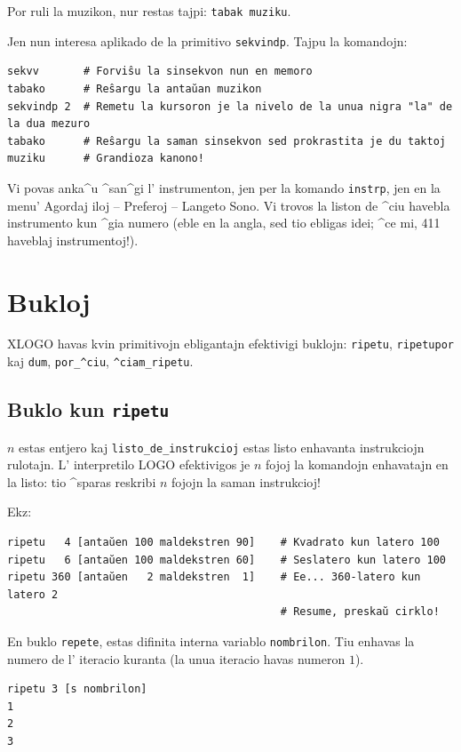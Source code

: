 Por ruli la muzikon, nur restas tajpi: \texttt{tabak muziku}.

Jen nun interesa aplikado de la primitivo \texttt{sekvindp}.  Tajpu la
komandojn:

\begin{verbatim}
sekvv       # Forviŝu la sinsekvon nun en memoro
tabako      # Reŝargu la antaŭan muzikon 
sekvindp 2  # Remetu la kursoron je la nivelo de la unua nigra "la" de la dua mezuro
tabako      # Reŝargu la saman sinsekvon sed prokrastita je du taktoj
muziku      # Grandioza kanono!
\end{verbatim}

Vi povas anka^u ^san^gi l' instrumenton, jen per la komando
\texttt{instrp}, jen en la menu' Agordaj iloj -- Preferoj -- Langeto
Sono.  Vi trovos la liston de ^ciu havebla instrumento kun ^gia numero
(eble en la angla, sed tio ebligas idei; ^ce mi, 411 haveblaj
instrumentoj!).

\section{Bukloj}

XLOGO havas kvin primitivojn ebligantajn efektivigi buklojn:
\texttt{ripetu}, \texttt{ripetupor} kaj \texttt{dum},
\texttt{por\_^ciu}, \texttt{^ciam\_ripetu}.

\subsection{Buklo kun \texttt{ripetu}}


$n$ estas entjero kaj \texttt{listo\_de\_instrukcioj} estas listo
enhavanta instrukciojn rulotajn.  L' interpretilo LOGO efektivigos je
$n$ fojoj la komandojn enhavatajn en la listo: tio ^sparas reskribi
$n$ fojojn la saman instrukcioj!  

Ekz:
\begin{verbatim}
ripetu   4 [antaŭen 100 maldekstren 90]    # Kvadrato kun latero 100
ripetu   6 [antaŭen 100 maldekstren 60]    # Seslatero kun latero 100
ripetu 360 [antaŭen   2 maldekstren  1]    # Ee... 360-latero kun latero 2
                                           # Resume, preskaŭ cirklo!
\end{verbatim}
\noindent 
{}

En buklo \texttt{repete}, estas difinita interna variablo
\texttt{nombrilon}.  Tiu enhavas la numero de l' iteracio kuranta (la
unua iteracio havas numeron $1$).
\begin{verbatim}
ripetu 3 [s nombrilon]
1
2
3
\end{verbatim}

